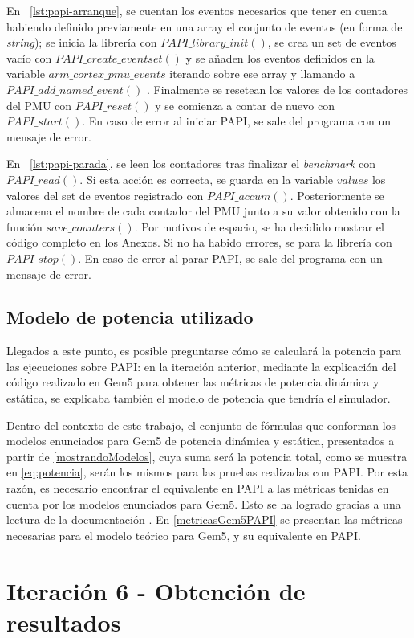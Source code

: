 En ~\ref{lst:papi-arranque}, se cuentan los eventos necesarios que tener en cuenta habiendo definido previamente en una array el conjunto de eventos (en forma de \textit{string}); se inicia la librería con $PAPI\_library\_init()$, se crea un set de eventos vacío con $PAPI\_create\_eventset()$ y se añaden los eventos definidos en la variable $arm\_cortex\_pmu\_events$ iterando sobre ese array y llamando a $PAPI\_add\_named\_event()$ . Finalmente se resetean los valores de los contadores del PMU con $PAPI\_reset()$ y se comienza a contar de nuevo con $PAPI\_start()$. En caso de error al iniciar PAPI, se sale del programa con un mensaje de error.

En ~\ref{lst:papi-parada}, se leen los contadores tras finalizar el \textit{benchmark} con $PAPI\_read()$. Si esta acción es correcta, se guarda en la variable $values$ los valores del set de eventos registrado con $PAPI\_accum()$. Posteriormente se almacena el nombre de cada contador del PMU junto a su valor obtenido con la función $save\_counters()$. Por motivos de espacio, se ha decidido mostrar el código completo en los Anexos. Si no ha habido errores, se para la librería con $PAPI\_stop()$. En caso de error al parar PAPI, se sale del programa con un mensaje de error. 

\subsection{Modelo de potencia utilizado}
Llegados a este punto, es posible preguntarse cómo se calculará la potencia para las ejecuciones sobre PAPI: en la iteración anterior, mediante la explicación del código realizado en Gem5 para obtener las métricas de potencia dinámica y estática, se explicaba también el modelo de potencia que tendría el simulador. 

Dentro del contexto de este trabajo, el conjunto de fórmulas que conforman los modelos enunciados para Gem5 de potencia dinámica y estática, presentados a partir de \ref{mostrandoModelos}, cuya suma será la potencia total, como se muestra en \ref{eq:potencia}, serán los mismos para las pruebas realizadas con PAPI. Por esta razón, es necesario encontrar el equivalente en PAPI a las métricas tenidas en cuenta por los modelos enunciados para Gem5. Esto se ha logrado gracias a una lectura de la documentación \cite{referencia-a72}. En \ref{metricasGem5PAPI} se presentan las métricas necesarias para el modelo teórico para Gem5, y su equivalente en PAPI.

\section{Iteración 6 - Obtención de resultados}

